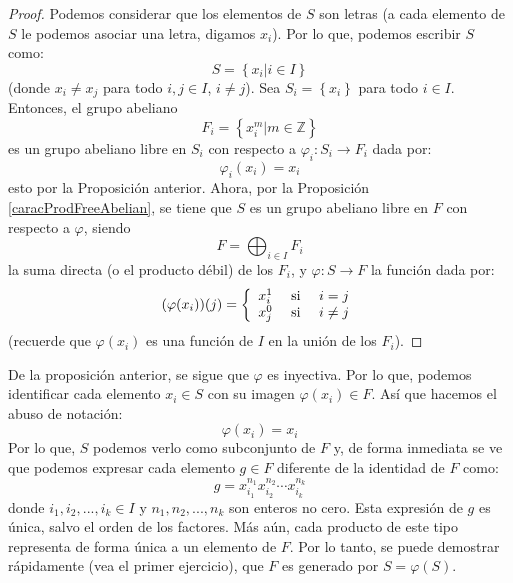 \documentclass[12pt]{report}
\theoremstyle{largebreak}
\newcommand\cf[3]{\ensuremath{#1:#2\rightarrow#3}}
\begin{document}
    \begin{proof}
        Podemos considerar que los elementos de $S$ son letras (a cada elemento de $S$ le podemos asociar una letra, digamos $x_i$). Por lo que, podemos escribir $S$ como:
        \begin{equation*}
            S=\left\{x_i\Big|i\in I \right\}
        \end{equation*}
        (donde $x_i\neq x_j$ para todo $i,j\in I$, $i\neq j$). Sea $S_i=\left\{x_i \right\}$ para todo $i\in I$. Entonces, el grupo abeliano
        \begin{equation*}
            F_i=\left\{x_i^m\Big|m\in\mathbb{Z} \right\}
        \end{equation*}
        es un grupo abeliano libre en $S_i$ con respecto a $\cf{\varphi_i}{S_i}{F_i}$ dada por:
        \begin{equation*}
            \varphi_i(x_i)=x_i
        \end{equation*}
        esto por la Proposición anterior. Ahora, por la Proposición \ref{caracProdFreeAbelian}, se tiene que $S$ es un grupo abeliano libre en $F$ con respecto a $\varphi$, siendo
        \begin{equation*}
            F=\bigoplus_{ i\in I}F_i
        \end{equation*}
        la suma directa (o el producto débil) de los $F_i$, y $\cf{\varphi}{S}{F}$ la función dada por:
        \begin{equation*}
            (\varphi(x_i))(j)=\left\{
                \begin{array}{lcr}
                    x_i^1 & \textup{ si } & i=j\\
                    x_j^0 & \textup{ si } & i\neq j\\
                \end{array}
            \right.
        \end{equation*}
        (recuerde que $\varphi(x_i)$ es una función de $I$ en la unión de los $F_i$).
    \end{proof}

    \begin{obs}
        De la proposición anterior, se sigue que $\varphi$ es inyectiva. Por lo que, podemos identificar cada elemento $x_i\in S$ con su imagen $\varphi(x_i)\in F$. Así que hacemos el abuso de notación:
        \begin{equation*}
            \varphi(x_i)=x_i
        \end{equation*}
        Por lo que, $S$ podemos verlo como subconjunto de $F$ y, de forma inmediata se ve que podemos expresar cada elemento $g\in F$ diferente de la identidad de $F$ como:
        \begin{equation*}
            g=x_{ i_1}^{ n_1}x_{ i_2}^{ n_2}\cdots x_{ i_k}^{ n_k}
        \end{equation*}
        donde $i_1,i_2,...,i_k\in I$ y $n_1,n_2,...,n_k$ son enteros no cero. Esta expresión de $g$ es única, salvo el orden de los factores. Más aún, cada producto de este tipo representa de forma única a un elemento de $F$. Por lo tanto, se puede demostrar rápidamente (vea el primer ejercicio), que $F$ es generado por $S=\varphi(S)$.
    \end{obs}
\end{document}
